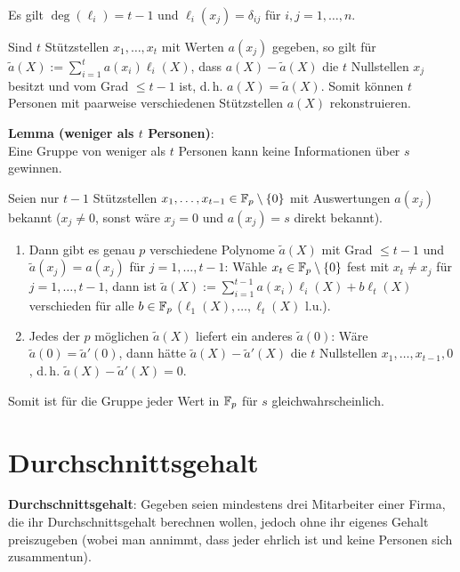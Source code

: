 Es gilt $\deg(\ell_i) = t - 1$ und $\ell_i(x_j) = \delta_{ij}$ für $i, j = 1, \dotsc, n$.

Sind $t$ Stützstellen $x_1, \dotsc, x_t$ mit Werten $a(x_j)$ gegeben, so gilt
für $\widetilde{a}(X) := \sum_{i=1}^t a(x_i) \ell_i(X)$,
dass $a(X) - \widetilde{a}(X)$ die $t$ Nullstellen $x_j$ besitzt und
vom Grad $\le t - 1$ ist, d.\,h. $a(X) = \widetilde{a}(X)$.
Somit können $t$ Personen mit paarweise verschiedenen Stützstellen $a(X)$ rekonstruieren.

\textbf{Lemma (weniger als $t$ Personen)}:\\
Eine Gruppe von weniger als $t$ Personen kann keine Informationen über $s$ gewinnen.

\begin{Beweis}
    Seien nur $t - 1$ Stützstellen $x_1, \dotsc, x_{t-1} \in \mathbb{F}_p \setminus \{0\}$
    mit Auswertungen $a(x_j)$ bekannt
    ($x_j \not= 0$, sonst wäre $x_j = 0$ und $a(x_j) = s$ direkt bekannt).
    \begin{enumerate}
        \item
        Dann gibt es genau $p$ verschiedene Polynome $\widetilde{a}(X)$ mit Grad $\le t - 1$ und
        $\widetilde{a}(x_j) = a(x_j)$ für $j = 1, \dotsc, t - 1$:
        Wähle $x_t \in \mathbb{F}_p \setminus \{0\}$ fest mit $x_t \not= x_j$ für $j = 1, \dotsc, t-1$,
        dann ist $\widetilde{a}(X) := \sum_{i=1}^{t-1} a(x_i) \ell_i(X) + b\ell_t(X)$
        verschieden für alle $b \in \mathbb{F}_p$
        ($\ell_1(X), \dotsc, \ell_t(X)$ l.u.).

        \item
        Jedes der $p$ möglichen $\widetilde{a}(X)$ liefert ein anderes $\widetilde{a}(0)$:
        Wäre $\widetilde{a}(0) = \widetilde{a}'(0)$, dann hätte
        $\widetilde{a}(X) - \widetilde{a}'(X)$
        die $t$ Nullstellen $x_1, \dotsc, x_{t-1}, 0$, d.\,h.
        $\widetilde{a}(X) - \widetilde{a}'(X) = 0$.
    \end{enumerate}
    Somit ist für die Gruppe jeder Wert in $\mathbb{F}_p$ für $s$ gleichwahrscheinlich.
\end{Beweis}

\pagebreak

\section{%
    Durchschnittsgehalt%
}

\textbf{Durchschnittsgehalt}:
Gegeben seien mindestens drei Mitarbeiter einer Firma, die ihr Durchschnittsgehalt berechnen
wollen, jedoch ohne ihr eigenes Gehalt preiszugeben
(wobei man annimmt, dass jeder ehrlich ist und keine Personen sich zusammentun).

